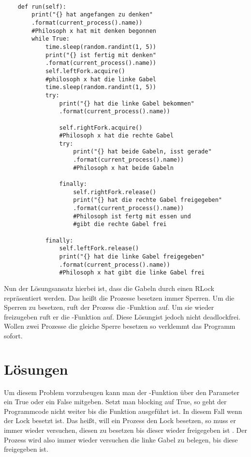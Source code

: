 \begin{lstlisting}[style = Python, label = {erste Lösung}, caption = {erste Lösung}]

    def run(self):
        print("{} hat angefangen zu denken"
        .format(current_process().name)) 
        #Philosoph x hat mit denken begonnen
        while True:
            time.sleep(random.randint(1, 5))
            print("{} ist fertig mit denken"
            .format(current_process().name))
            self.leftFork.acquire() 
            #philosoph x hat die linke Gabel
            time.sleep(random.randint(1, 5))
            try:
                print("{} hat die linke Gabel bekommen"
                .format(current_process().name))

                self.rightFork.acquire() 
                #Philosoph x hat die rechte Gabel
                try:
                    print("{} hat beide Gabeln, isst gerade"
                    .format(current_process().name)) 
                    #Philosoph x hat beide Gabeln

                finally:
                    self.rightFork.release()
                    print("{} hat die rechte Gabel freigegeben"
                    .format(current_process().name)) 
                    #Philosoph ist fertg mit essen und 
                    #gibt die rechte Gabel frei

            finally:
                self.leftFork.release()
                print("{} hat die linke Gabel freigegeben"
                .format(current_process().name)) 
                #Philosoph x hat gibt die linke Gabel frei

\end{lstlisting}

Nun der Lösungsansatz hierbei ist, dass die Gabeln durch einen RLock repräsentiert werden. Das heißt die Prozesse besetzen immer Sperren. Um die Sperren zu besetzen, ruft der Prozess die -Funktion auf. Um sie wieder freizugeben ruft er die -Funktion auf. Diese \glqq Lösung\grqq ist jedoch nicht deadlockfrei. Wollen zwei Prozesse die gleiche Sperre besetzen so verklemmt das Programm sofort. 

\section{Lösungen}
\label{endlösung}

Um diesem Problem vorzubeugen kann man der -Funktion über den Parameter  ein True oder ein False mitgeben. Setzt man blocking auf True, so geht der Programmcode nicht weiter bis die Funktion ausgeführt ist. In diesem Fall wenn der Lock besetzt ist. Das heißt, will ein Prozess den Lock besetzen, so muss er immer wieder versuchen, diesen zu besetzen bis dieser wieder freigegeben ist \parencite[vgl. ]{lock}. Der Prozess wird also immer wieder versuchen die linke Gabel zu belegen, bis diese freigegeben ist. 

